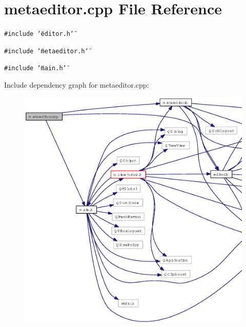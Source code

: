 \section{metaeditor.cpp File Reference}
\label{metaeditor_8cpp}
{\tt \#include \char`\"{}editor.h\char`\"{}}\par
{\tt \#include \char`\"{}metaeditor.h\char`\"{}}\par
{\tt \#include \char`\"{}main.h\char`\"{}}\par


Include dependency graph for metaeditor.cpp:\begin{figure}[H]
\begin{center}
\leavevmode
\includegraphics[width=362pt]{metaeditor_8cpp__incl}
\end{center}
\end{figure}
